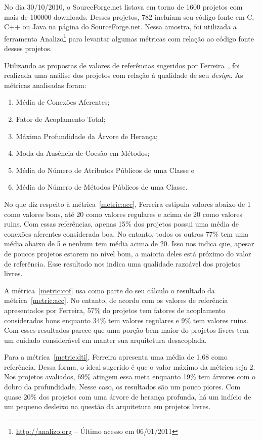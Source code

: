 No dia 30/10/2010, o SourceForge.net listava em torno de 1600 projetos
com mais de 100000 downloads. Desses projetos, 782 incluíam seu código
fonte em C, C++ ou Java na página do SourceForge.net.  Nessa amostra,
foi utilizada a ferramenta Analizo\footnote{\url{http://analizo.org}
  -- Último acesso em 06/01/2011} \cite{Terceiro2010} para levantar
algumas métricas com relação ao código fonte desses projetos.

Utilizando as propostas de valores de referências sugeridos por
Ferreira~\cite{Ferreira2009}, foi realizada uma análise dos projetos
com relação à qualidade de seu \textit{design}. As métricas analisadas
foram:
\begin{enumerate}
\item Média de Conexões Aferentes;
  \label{metric:acc}
\item Fator de Acoplamento Total;
  \label{metric:cof}
\item Máxima Profundidade da Árvore de Herança;
  \label{metric:dti}
\item Moda da Ausência de Coesão em Métodos;
  \label{metric:lcom}
\item Média do Número de Atributos Públicos de uma Classe e
  \label{metric:npa}
\item Média do Número de Métodos Públicos de uma Classe.
  \label{metric:npm}
\end{enumerate}

No que diz respeito à métrica~\ref{metric:acc}, Ferreira estipula
valores abaixo de 1 como valores bons, até 20 como valores regulares e
acima de 20 como valores ruins. Com essas referências, apenas 15\% dos
projetos possui uma média de conexões aferentes considerada boa. No
entanto, todos os outros 77\% tem uma média abaixo de 5 e nenhum tem
média acima de 20. Isso nos indica que, apesar de poucos projetos
estarem no nível bom, a maioria deles está próximo do valor de
referência. Esse resultado nos indica uma qualidade razoável dos
projetos livres.

A métrica~\ref{metric:cof} usa como parte do seu cálculo o resultado
da métrica~\ref{metric:acc}. No entanto, de acordo com os valores de
referência apresentados por Ferreira, 57\% do projetos tem fatores de
acoplamento considerados bons enquanto 34\% tem valores regulares e
9\% tem valores ruins. Com esses resultados parece que uma porção bem
maior do projetos livres tem um cuidado considerável em manter sua
arquitetura desacoplada.

Para a métrica~\ref{metric:dti}, Ferreira apresenta uma média de 1,68
como referência. Dessa forma, o ideal sugerido é que o valor máximo da
métrica seja 2. Nos projetos avaliados, 69\% atingem essa meta
enquanto 19\% tem árvores com o dobro da profundidade. Nesse caso, os
resultados são um pouco piores. Com quase 20\% dos projetos com uma
árvore de herança profunda, há um indício de um pequeno desleixo na
questão da arquitetura em projetos livres.

